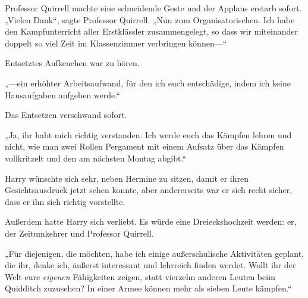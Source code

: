 Professor Quirrell machte eine schneidende Geste und der Applaus erstarb sofort. „Vielen Dank“, sagte Professor Quirrell. „Nun zum Organisatorischen. Ich habe den Kampfunterricht aller Erstklässler zusammengelegt, so dass wir miteinander doppelt so viel Zeit im Klassenzimmer verbringen können—“

Entsetztes Aufkeuchen war zu hören.

„—ein erhöhter Arbeitsaufwand, für den ich euch entschädige, indem ich keine Hausaufgaben aufgeben werde.“

Das Entsetzen verschwand sofort.

„Ja, ihr habt mich richtig verstanden. Ich werde euch das Kämpfen lehren und nicht, wie man zwei Rollen Pergament mit einem Aufsatz über das Kämpfen vollkritzelt und den am nächsten Montag abgibt.“

Harry wünschte sich sehr, neben Hermine zu sitzen, damit er ihren Gesichtsausdruck jetzt sehen konnte, aber andererseits war er sich recht sicher, dass er ihn sich richtig vorstellte.

Außerdem hatte Harry sich verliebt. Es würde eine Dreieckshochzeit werden: er, der Zeitumkehrer und Professor Quirrell.

„Für diejenigen, die möchten, habe ich einige außerschulische Aktivitäten geplant, die ihr, denke ich, äußerst interessant und lehrreich finden werdet. Wollt ihr der Welt eure \emph{eigenen} Fähigkeiten zeigen, statt vierzehn anderen Leuten beim Quidditch zuzusehen? In einer Armee können mehr als sieben Leute kämpfen.“

